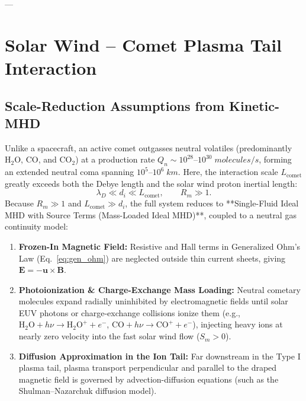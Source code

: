 \documentclass[11pt,a4paper]{article}
\newcommand{\vect}[1]{\bm{#1}}
\begin{document}
---

\section{Solar Wind -- Comet Plasma Tail Interaction}

\subsection{Scale-Reduction Assumptions from Kinetic-MHD}
Unlike a spacecraft, an active comet outgasses neutral volatiles (predominantly $\text{H}_2\text{O}$, $\text{CO}$, and $\text{CO}_2$) at a production rate $Q_n \sim 10^{28}\text{--}10^{30}\;\si{molecules/s}$, forming an extended neutral coma spanning $10^5\text{--}10^6\;\si{km}$. Here, the interaction scale $L_{\text{comet}}$ greatly exceeds both the Debye length and the solar wind proton inertial length:
\begin{equation}
    \lambda_D \ll d_i \ll L_{\text{comet}}, \qquad R_m \gg 1.
\end{equation}
Because $R_m \gg 1$ and $L_{\text{comet}} \gg d_i$, the full system reduces to **Single-Fluid Ideal MHD with Source Terms (Mass-Loaded Ideal MHD)**, coupled to a neutral gas continuity model:
\begin{enumerate}
    \item \textbf{Frozen-In Magnetic Field:} Resistive and Hall terms in Generalized Ohm's Law (Eq.~\ref{eq:gen_ohm}) are neglected outside thin current sheets, giving $\vect{E} = -\vect{u} \times \vect{B}$.
    \item \textbf{Photoionization \& Charge-Exchange Mass Loading:} Neutral cometary molecules expand radially uninhibited by electromagnetic fields until solar EUV photons or charge-exchange collisions ionize them (e.g., $\text{H}_2\text{O} + h\nu \to \text{H}_2\text{O}^+ + e^-$, $\text{CO} + h\nu \to \text{CO}^+ + e^-$), injecting heavy ions at nearly zero velocity into the fast solar wind flow ($S_m > 0$).
    \item \textbf{Diffusion Approximation in the Ion Tail:} Far downstream in the Type I plasma tail, plasma transport perpendicular and parallel to the draped magnetic field is governed by advection-diffusion equations (such as the Shulman--Nazarchuk diffusion model).
\end{enumerate}
\end{document}
